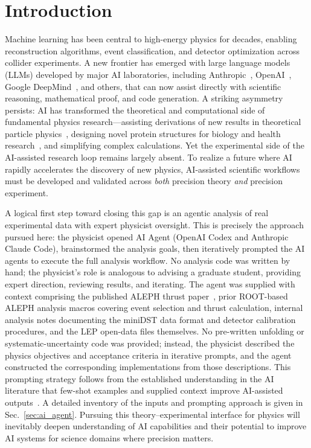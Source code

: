 \section{Introduction}
\label{sec:introduction}

Machine learning has been central to high-energy physics for decades, enabling
reconstruction algorithms, event classification, and detector optimization across
collider experiments. A new frontier has emerged with large language models (LLMs)
developed by major AI laboratories, including
Anthropic~\cite{Anthropic:2025accelerating}, OpenAI~\cite{OpenAI:2025gpt5science},
Google DeepMind~\cite{GoogleDeepMind:2025geminiscience}, and others, that can now
assist directly with scientific reasoning, mathematical proof, and code generation.
A striking asymmetry persists: AI has transformed the theoretical and computational side of fundamental physics research---assisting derivations of new results in theoretical particle physics~\cite{OpenAI:2025newresult}, designing novel protein structures for biology and health research~\cite{GoogleDeepMind:2025alphaproteo}, and simplifying complex calculations. Yet the experimental side of the AI-assisted research loop remains largely absent. To realize a future where AI rapidly accelerates the discovery of new physics, AI-assisted scientific workflows must be developed and validated across \textit{both} precision theory \textit{and} precision experiment.

A logical first step toward closing this gap is an agentic analysis of real
experimental data with expert physicist oversight. This is precisely the approach
pursued here: the physicist opened AI Agent (OpenAI Codex and Anthropic Claude Code), brainstormed the
analysis goals, then iteratively prompted the AI agents to execute the full
analysis workflow. No analysis code was written by hand; the physicist's role is
analogous to advising a graduate student, providing expert direction, reviewing
results, and iterating. The agent was supplied with context comprising the published ALEPH thrust paper~\cite{Heister:2003aj}, prior ROOT-based ALEPH analysis macros covering event selection and thrust calculation, internal analysis notes documenting the miniDST data format and detector calibration procedures, and the LEP open-data files themselves. No pre-written unfolding or systematic-uncertainty code was provided; instead, the physicist described the physics objectives and acceptance criteria in iterative prompts, and the agent constructed the corresponding implementations from those descriptions. This prompting strategy follows from the established understanding in the AI literature that few-shot examples and supplied context improve AI-assisted outputs~\cite{Brown:2020fewshot,Wei:2022cot}. A detailed inventory of the inputs and prompting approach is given in Sec.~\ref{sec:ai_agent}.
Pursuing this theory--experimental interface for physics will inevitably deepen
understanding of AI capabilities and their potential to improve AI systems for
science domains where precision matters.

